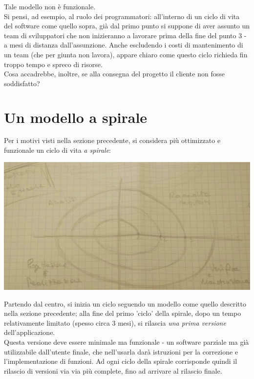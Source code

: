 Tale modello non è funzionale.\\
Si pensi, ad esempio, al ruolo dei programmatori: all'interno di un ciclo di vita del software come quello sopra, già dal primo punto si suppone di aver assunto un team di sviluppatori che non inizieranno a lavorare prima della fine del punto 3 - a mesi di distanza dall'assunzione. Anche escludendo i costi di mantenimento di un team (che per giunta non lavora), appare chiaro come questo ciclo richieda fin troppo tempo e spreco di risorse.\\
Cosa accadrebbe, inoltre, se alla consegna del progetto il cliente non fosse soddisfatto?

\section{Un modello a spirale}
Per i motivi visti nella sezione precedente, si considera più ottimizzato e funzionale un ciclo di vita \textit{a spirale}:
\begin{center}
    \includegraphics[width=.5\textwidth]{res/spiral.jpg} \hfill
\end{center}
\newpage

Partendo dal centro, si inizia un ciclo seguendo un modello come quello descritto nella sezione precedente; alla fine del primo 'ciclo' della spirale, dopo un tempo relativamente limitato (spesso circa 3 mesi), si rilascia \textit{una prima \textit{}versione} dell'applicazione.\\
Questa versione deve essere minimale ma funzionale - un software parziale ma già utilizzabile dall'utente finale, che nell'usarla darà istruzioni per la correzione e l'implementazione di funzioni. Ad ogni ciclo della spirale corrisponde quindi il rilascio di versioni via via più complete, fino ad arrivare al rilascio finale.

